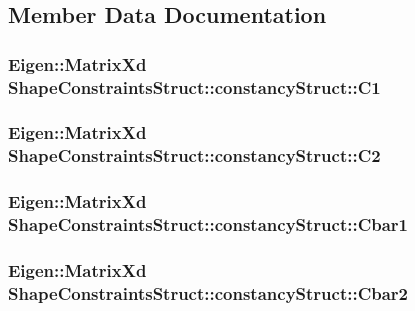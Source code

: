 \subsection{\-Member \-Data \-Documentation}
\hypertarget{structShapeConstraintsStruct_1_1constancyStruct_a703f12b002822f13a142bf468c193161}{
\subsubsection[{\-C1}]{\setlength{\rightskip}{0pt plus 5cm}\-Eigen\-::\-Matrix\-Xd {\bf \-Shape\-Constraints\-Struct\-::constancy\-Struct\-::\-C1}}}\label{structShapeConstraintsStruct_1_1constancyStruct_a703f12b002822f13a142bf468c193161}
\hypertarget{structShapeConstraintsStruct_1_1constancyStruct_ac2dda40a92114bf4537ed8e837258a61}{
\subsubsection[{\-C2}]{\setlength{\rightskip}{0pt plus 5cm}\-Eigen\-::\-Matrix\-Xd {\bf \-Shape\-Constraints\-Struct\-::constancy\-Struct\-::\-C2}}}\label{structShapeConstraintsStruct_1_1constancyStruct_ac2dda40a92114bf4537ed8e837258a61}
\hypertarget{structShapeConstraintsStruct_1_1constancyStruct_aac1e5c742a7c5d837e1810722ef88351}{
\subsubsection[{\-Cbar1}]{\setlength{\rightskip}{0pt plus 5cm}\-Eigen\-::\-Matrix\-Xd {\bf \-Shape\-Constraints\-Struct\-::constancy\-Struct\-::\-Cbar1}}}\label{structShapeConstraintsStruct_1_1constancyStruct_aac1e5c742a7c5d837e1810722ef88351}
\hypertarget{structShapeConstraintsStruct_1_1constancyStruct_a300bae364575fe901332ccf699e5b5e5}{
\subsubsection[{\-Cbar2}]{\setlength{\rightskip}{0pt plus 5cm}\-Eigen\-::\-Matrix\-Xd {\bf \-Shape\-Constraints\-Struct\-::constancy\-Struct\-::\-Cbar2}}}\label{structShapeConstraintsStruct_1_1constancyStruct_a300bae364575fe901332ccf699e5b5e5}
